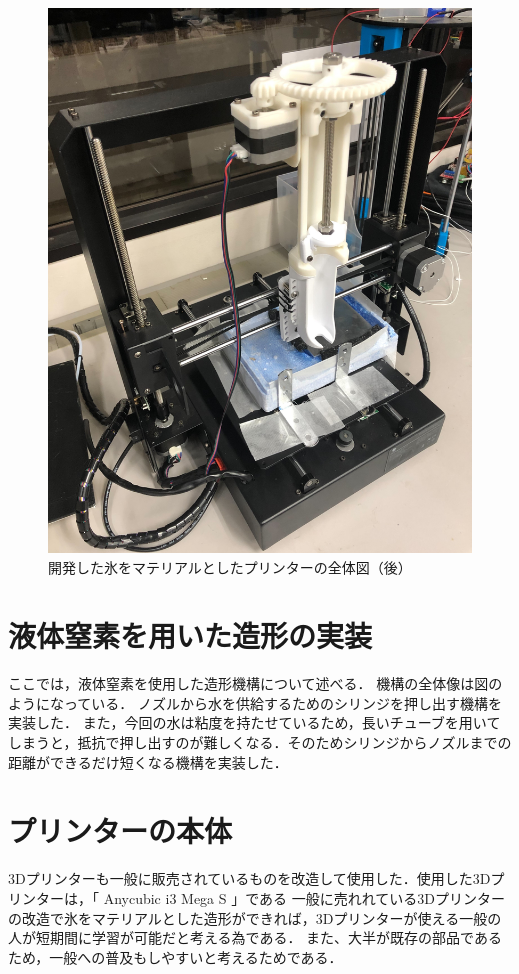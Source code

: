 \begin{figure}[H]
  \centering
  \includegraphics[width=9truecm]{./fig/printer2.jpg}
  \caption{開発した氷をマテリアルとしたプリンターの全体図（後）}
  \label{fig:printer2}
\end{figure}



\section{液体窒素を用いた造形の実装}
\label{sec:paragraph}
ここでは，液体窒素を使用した造形機構について述べる．
機構の全体像は図のようになっている．
ノズルから水を供給するためのシリンジを押し出す機構を実装した．
また，今回の水は粘度を持たせているため，長いチューブを用いてしまうと，抵抗で押し出すのが難しくなる．そのためシリンジからノズルまでの距離ができるだけ短くなる機構を実装した．

\section{プリンターの本体}
\label{sec:paragraph}
3Dプリンターも一般に販売されているものを改造して使用した．使用した3Dプリンターは，「 Anycubic i3 Mega S 」である
一般に売れれている3Dプリンターの改造で氷をマテリアルとした造形ができれば，3Dプリンターが使える一般の人が短期間に学習が可能だと考える為である．
また、大半が既存の部品であるため，一般への普及もしやすいと考えるためである．

